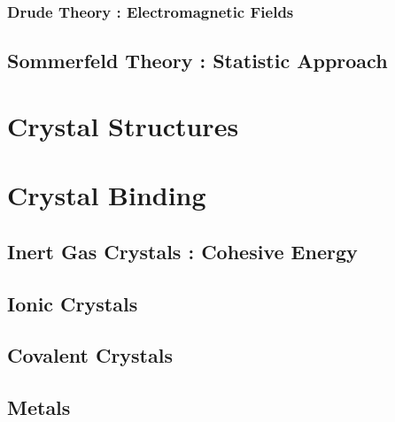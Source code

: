 \documentclass[paper=a4, fontsize=11pt]{scrartcl}
\begin{document}
\vspace{0.15in}
\subsubsection{Drude Theory : Electromagnetic Fields}
\vspace{0.15in}


\vspace{0.15in}
\subsection{Sommerfeld Theory : Statistic Approach}
\vspace{0.15in}

\vspace{0.25in}
\section{Crystal Structures}
\vspace{0.25in}

\vspace{0.25in}
\section{Crystal Binding}
\vspace{0.25in}

\vspace{0.15in}
\subsection{Inert Gas Crystals : Cohesive Energy}
\vspace{0.15in}

\vspace{0.15in}
\subsection{Ionic Crystals}
\vspace{0.15in}

\vspace{0.15in}
\subsection{Covalent Crystals}
\vspace{0.15in}

\vspace{0.15in}
\subsection{Metals}
\vspace{0.15in}
\end{document}
